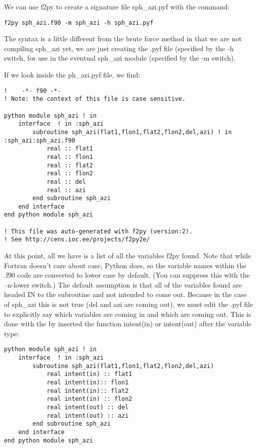 {We can use {\color{blue}f2py} to create a signature file {\color{blue} sph\_azi.pyf} with the command: 


{\singlespacing \color{blue} \begin{verbatim}
f2py sph_azi.f90 -m sph_azi -h sph_azi.pyf
\end{verbatim}}

\noindent The syntax is a little different  from the brute force method in that we are not compiling {\color{blue}sph\_azi} yet, we are just creating the .pyf file (specified by the {\color{blue}-h} switch, for use in the eventual {\color{blue}sph\_azi} module (specified by the {\color{blue}-m} switch).  

If we look inside the {\color{blue}ph\_azi.pyf} file, we find:


{\singlespacing \color{blue} \begin{verbatim}
!    -*- f90 -*-
! Note: the context of this file is case sensitive.

python module sph_azi ! in 
    interface  ! in :sph_azi
        subroutine sph_azi(flat1,flon1,flat2,flon2,del,azi) ! in :sph_azi:sph_azi.f90
            real :: flat1
            real :: flon1
            real :: flat2
            real :: flon2
            real :: del
            real :: azi
        end subroutine sph_azi
    end interface 
end python module sph_azi

! This file was auto-generated with f2py (version:2).
! See http://cens.ioc.ee/projects/f2py2e/
\end{verbatim}}


\noindent  At this point, all we have is a list of  all the variables {\color{blue}f2py} found.  Note that while Fortran doesn't care about case, Python does, so the variable names within the .f90 code are converted to lower case by default.  (You can suppress this with the {\color{blue}--n-lower} switch.)
The default assumption is that all of the variables found are headed IN to the subroutine and not intended to come out. 
Because in the case of {\color{blue}sph\_azi} this is not true ({\color{blue}del} and {\color{blue}azi} are coming out),  we must edit the .pyf file to explicitly say which variables are coming in and which are coming out. This is done with the by inserted the function {\color{blue}intent(in)} or {\color{blue}intent(out)} after the variable type:  

{\singlespacing \color{blue} \begin{verbatim}
python module sph_azi ! in 
    interface  ! in :sph_azi
        subroutine sph_azi(flat1,flon1,flat2,flon2,del,azi)
            real intent(in) :: flat1
            real intent(in):: flon1
            real intent(in):: flat2
            real intent(in) :: flon2
            real intent(out) :: del
            real intent(out) :: azi
        end subroutine sph_azi
    end interface 
end python module sph_azi
\end{verbatim}}


}
